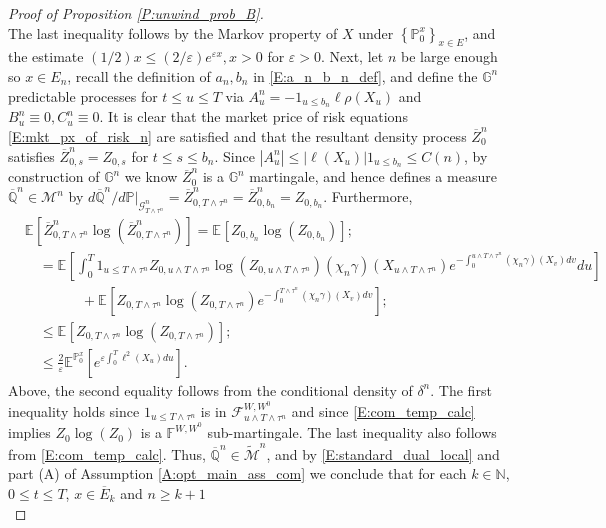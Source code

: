 \documentclass[11pt, letterpaper]{amsart}
\theoremstyle{definition}
\theoremstyle{remark}
\numberwithin{equation}{section}
\newcommand{\nats}{\mathbb N}
\newcommand{\eps}{\varepsilon}
\newcommand{\prob}{\mathbb{P}}
\newcommand{\qprob}{\mathbb{Q}}
\newcommand{\esp}{\mathbb{E}}
\newcommand{\espalt}[2]{\esp^{#1}\bra{#2}}
\newcommand{\F}{\mathcal{F}}
\newcommand{\G}{\mathcal{G}}
\newcommand{\M}{\mathcal{M}}
\newcommand{\tM}{\widetilde{\mathcal{M}}}
\newcommand{\filt}{\mathbb{F}}
\newcommand{\filtg}{\mathbb{G}}
\newcommand{\bra}[1]{\left[#1\right]}
\newcommand{\cbra}[1]{\left\{#1\right\}}
\newcommand{\ol}[1]{\overline{#1}}
\begin{document}
\begin{proof}[Proof of Proposition \ref{P:unwind_prob_B}]
\begin{equation}
\end{equation}
The last inequality follows by the Markov property of $X$ under $\cbra{\prob^x_0}_{x\in E}$, and the estimate $(1/2)x \leq (2/\eps)e^{\eps x}, x>0$ for $\eps>0$.  Next, let $n$ be large enough so $x\in E_n$, recall the definition of $a_n,b_n$ in \eqref{E:a_n_b_n_def}, and define the $\filtg^n$ predictable processes for $t\leq u\leq T$ via $A^n_u = -1_{u\leq b_n}\ell\rho(X_u)$ and $B^n_u\equiv 0, C^n_u\equiv 0$.  It is clear that the market price of risk equations \eqref{E:mkt_px_of_risk_n} are satisfied and that the resultant density process $\ol{Z}^n_{0}$ satisfies $\ol{Z}^n_{0,s} = Z_{0,s}$ for $t\leq s\leq b_n$.  Since $|A^n_u| \leq |\ell(X_u)|1_{u\leq b_n} \leq C(n)$, by construction of $\filtg^n$ we know $\ol{Z}^n_0$ is a $\filtg^n$ martingale, and hence defines a measure $\ol{\qprob}^n \in \M^n$ by $d\ol{\qprob}^n / d\prob \big|_{\G^n_{T\wedge\tau^n}} =  \ol{Z}^n_{0,T\wedge\tau^n} =  \ol{Z}^n_{0,b_n} = Z_{0,b_n}$.   Furthermore,
\begin{equation*}
\begin{split}
&\espalt{}{\ol{Z}^n_{0,T\wedge\tau^n}\log\left(\ol{Z}^n_{0,T\wedge\tau^n}\right)} = \espalt{}{Z_{0,b_n}\log\left(Z_{0,b_n}\right)};\\
&\quad = \espalt{}{\int_0^T 1_{u\leq T\wedge\tau^n} Z_{0,u\wedge T\wedge \tau^n}\log(Z_{0,u\wedge T\wedge\tau^n})(\chi_n\gamma)(X_{u\wedge T\wedge\tau^n}) e^{-\int_0^{u\wedge T\wedge\tau^n} (\chi_n\gamma)(X_v)dv}du}\\
&\qquad\qquad  + \espalt{}{Z_{0,T\wedge\tau^n}\log\left(Z_{0,T\wedge\tau^n}\right)e^{-\int_0^{T\wedge\tau^n}(\chi_n\gamma)(X_v)dv}};\\
&\quad \leq \espalt{}{Z_{0,T\wedge\tau^n}\log\left(Z_{0,T\wedge\tau^n}\right)};\\
&\quad \leq \frac{2}{\eps}\espalt{\prob^x_{0}}{e^{\eps\int_0^T \ell^2(X_u)du}}.
\end{split}
\end{equation*}
Above, the second equality follows from the conditional density of $\delta^n$.  The first inequality holds since $1_{u\leq T\wedge\tau^n}$ is in $\F^{W,W^0}_{u\wedge T\wedge\tau^n}$ and since \eqref{E:com_temp_calc} implies $Z_0\log(Z_0)$ is a $\filt^{W,W^0}$ sub-martingale. The last inequality also follows from \eqref{E:com_temp_calc}.  Thus, $\ol{\qprob}^n\in\tM^n$, and by \eqref{E:standard_dual_local} and part (A) of Assumption \ref{A:opt_main_ass_com} we conclude that for each $k\in\nats$, $0\leq t\leq T$, $x\in \ol{E}_k$ and $n\geq k+1$
\begin{equation*}

\end{equation*}
\end{proof}
\end{document}
